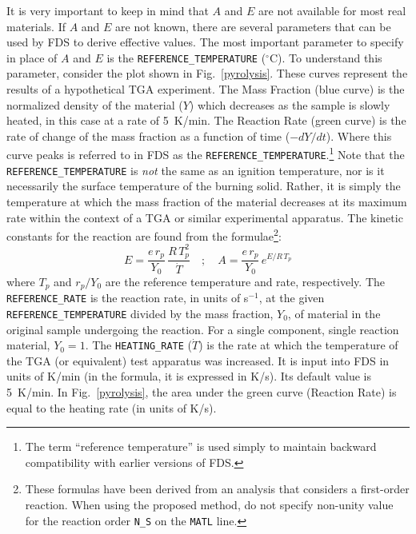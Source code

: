 \documentclass[11pt]{book}
\newcommand{\ct}{\tt\small}
\newcommand{\be}{\begin{equation}}
\newcommand{\ee}{\end{equation}}
\begin{document}
It is very important to keep in mind that $A$ and $E$ are not available for most real materials. If $A$ and $E$ are not known,
there are several parameters that can be used by FDS to derive effective values. The most important parameter to
specify in place of $A$ and $E$ is
the  {\ct REFERENCE\_TEMPERATURE} ($^\circ$C). To understand this parameter, consider the plot shown in Fig.~\ref{pyrolysis}.
These curves represent the results of a hypothetical TGA experiment.
The Mass Fraction (blue curve) is the normalized density of the material ($Y$) which decreases as the sample is slowly heated,
in this case at a rate
of 5~K/min. The Reaction Rate (green curve) is the rate of change of the mass fraction as a function of time ($-dY/dt$).
Where this curve peaks is referred to in FDS
as the {\ct REFERENCE\_TEMPERATURE}.\footnote{The term ``reference temperature'' is used simply to maintain
backward compatibility with earlier versions of
FDS.}  Note that the {\ct REFERENCE\_TEMPERATURE} is {\em not} the same as an ignition temperature, nor is it necessarily
the surface temperature of the burning solid. Rather, it is simply the temperature at which the mass fraction of the material
decreases at its maximum rate within the context of a TGA or similar experimental apparatus. The
kinetic constants for the reaction are found from the formulae\footnote{These formulas have been derived from an analysis that considers a first-order reaction.
When using the proposed method,
do not specify non-unity value for the reaction order {\ct N\_S} on the {\ct MATL} line.}:
\be
   E = \frac{e \, r_p}{Y_0} \, \frac{R \, T_p^2}{\dot{T}} \quad ; \quad
   A = \frac{e \, r_p}{Y_0} \, e^{E/R \, T_p} \label{AandE}
\ee
where $T_p$ and $r_p/Y_0$ are the reference temperature and rate, respectively. The
{\ct REFERENCE\_RATE} is the reaction rate, in units of s$^{-1}$, at the given {\ct REFERENCE\_TEMPERATURE} divided by
the mass fraction, $Y_0$, of material in the original sample undergoing the reaction. For a single component, single
reaction material, $Y_0=1$. The {\ct HEATING\_RATE} ($\dot{T}$) is
the rate at which the temperature of the TGA (or equivalent) test
apparatus was increased. It is input into FDS in units of K/min (in the formula, it is expressed in K/s).
Its default value is 5~K/min. In Fig.~\ref{pyrolysis}, the area under the green curve
(Reaction Rate) is equal to the heating rate (in units of K/s).
\end{document}
